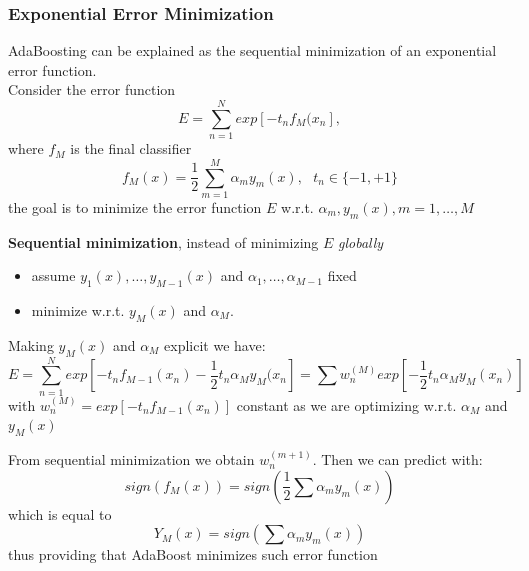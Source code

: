 \subsubsection{Exponential Error Minimization}
AdaBoosting can be explained as the sequential minimization of an exponential error function.\\
Consider the error function
\begin{equation}
    E = \sum_{n=1}^{N}exp[-t_{n}f_{M}(x_{n}],
\end{equation}
where $f_{M}$ is the final classifier
\begin{equation}
    f_{M}(x) = \frac{1}{2}\sum_{m=1}^{M}\alpha_{m}y_{m}(x),\ \ \ t_{n}\in \{-1, +1\}
\end{equation}
the goal is to minimize the error function $E$ w.r.t. $\alpha_{m}, y_{m}(x), m=1, \dots, M$

\textbf{Sequential minimization}, instead of minimizing $E$ \textit{globally}
\begin{itemize}
    \item assume $y_{1}(x), \dots, y_{M-1}(x)$ and $\alpha_{1}, \dots, \alpha_{M-1}$ fixed
    \item minimize w.r.t. $y_{M}(x)$ and $\alpha_{M}$.
\end{itemize}
Making $y_{M}(x)$ and $\alpha_{M}$ explicit we have:
\begin{equation}
    E=\sum_{n=1}^{N} exp[-t_{n}f_{M-1}(x_{n}) - \frac{1}{2}t_{n}\alpha_{M}y_{M}(x_{n}] = \sum w_{n}^{(M)}exp[-\frac{1}{2}t_{n}\alpha_{M}y_{M}(x_{n})]
\end{equation}
with $ w_{n}^{(M)} = exp[-t_{n}f_{M-1}(x_{n})]$ constant as we are optimizing w.r.t. $\alpha_{M}$ and $y_{M}(x)$

From sequential minimization we obtain $w_{n}^{(m+1)}$. Then we can predict with:
\begin{equation}
    sign(f_{M}(x)) = sign(\frac{1}{2}\sum \alpha_{m}y_{m}(x))
\end{equation}
which is equal to
\begin{equation}
    Y_{M}(x) =  sign(\sum \alpha_{m}y_{m}(x))
\end{equation}
thus providing that AdaBoost minimizes such error function

